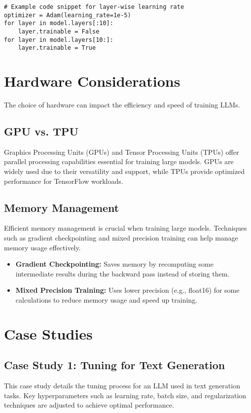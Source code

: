 \begin{verbatim}
# Example code snippet for layer-wise learning rate
optimizer = Adam(learning_rate=1e-5)
for layer in model.layers[:10]:
    layer.trainable = False
for layer in model.layers[10:]:
    layer.trainable = True
\end{verbatim}

\section{Hardware Considerations}
The choice of hardware can impact the efficiency and speed of training LLMs.

\subsection{GPU vs. TPU}
Graphics Processing Units (GPUs) and Tensor Processing Units (TPUs) offer parallel processing capabilities essential for training large models. GPUs are widely used due to their versatility and support, while TPUs provide optimized performance for TensorFlow workloads.

\subsection{Memory Management}
Efficient memory management is crucial when training large models. Techniques such as gradient checkpointing and mixed precision training can help manage memory usage effectively.

\begin{itemize}
    \item \textbf{Gradient Checkpointing:} Saves memory by recomputing some intermediate results during the backward pass instead of storing them.
    \item \textbf{Mixed Precision Training:} Uses lower precision (e.g., float16) for some calculations to reduce memory usage and speed up training.
\end{itemize}

\section{Case Studies}
\subsection{Case Study 1: Tuning for Text Generation}
This case study details the tuning process for an LLM used in text generation tasks. Key hyperparameters such as learning rate, batch size, and regularization techniques are adjusted to achieve optimal performance.

